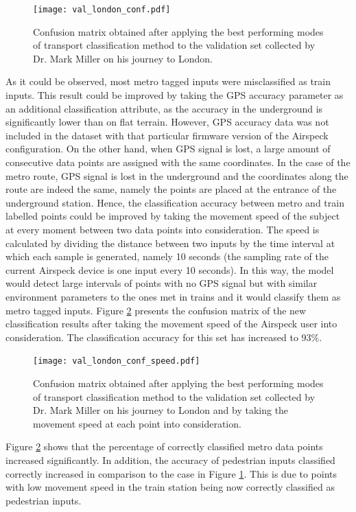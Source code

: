 \documentclass[bsc,frontabs,twoside,singlespacing, parskip,deptreport]{infthesis}     %
\begin{document}
\begin{figure}[h!]
  \center
  \texttt{[image: val\_london\_conf.pdf]}
  \caption{Confusion matrix obtained after applying the best performing modes of transport classification method to the validation set collected by Dr. Mark Miller on his journey to London.}
  \label{fig:val_london_conf}
\end{figure}

As it could be observed, most metro tagged inputs were misclassified as train inputs. This result could be improved by taking the GPS accuracy parameter as an additional classification attribute, as the accuracy in the underground is significantly lower than on flat terrain. However, GPS accuracy data was not included in the dataset with that particular firmware version of the Airspeck configuration. On the other hand, when GPS signal is lost, a large amount of consecutive data points are assigned with the same coordinates. In the case of the metro route, GPS signal is lost in the underground and the coordinates along the route are indeed the same, namely the points are placed at the entrance of the underground station. Hence, the classification accuracy between metro and train labelled points could be improved by taking the movement speed of the subject at every moment between two data points into consideration. The speed is calculated by dividing the distance between two inputs by the time interval at which each sample is generated, namely 10 seconds (the sampling rate of the current Airspeck device is one input every 10 seconds). In this way, the model would detect large intervals of points with no GPS signal but with similar environment parameters to the ones met in trains and it would classify them as metro tagged inputs. Figure \ref{fig:val_london_conf_speed} presents the confusion matrix of the new classification results after taking the movement speed of the Airspeck user into consideration. The classification accuracy for this set has increased to 93\%.

\begin{figure}[h!]
  \center
  \texttt{[image: val\_london\_conf\_speed.pdf]}
  \caption{Confusion matrix obtained after applying the best performing modes of transport classification method to the validation set collected by Dr. Mark Miller on his journey to London and by taking the movement speed at each point into consideration.}
  \label{fig:val_london_conf_speed}
\end{figure}

Figure \ref{fig:val_london_conf_speed} shows that the percentage of correctly classified metro data points increased significantly. In addition, the accuracy of pedestrian inputs classified correctly increased in comparison to the case in Figure \ref{fig:val_london_conf}. This is due to points with low movement speed in the train station being now correctly classified as pedestrian inputs.
\end{document}

